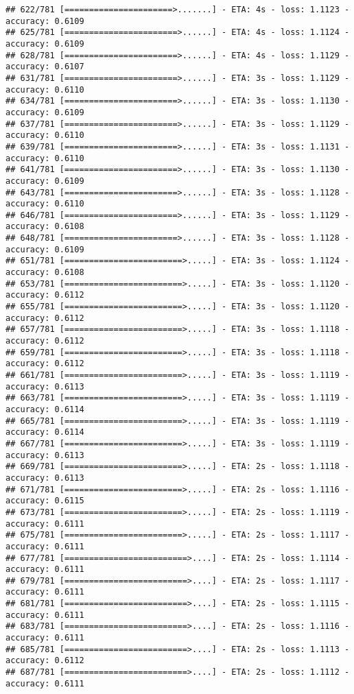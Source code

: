 \documentclass[
]{article}
\begin{document}
\begin{verbatim}
## 622/781 [======================>.......] - ETA: 4s - loss: 1.1123 - accuracy: 0.6109
## 625/781 [=======================>......] - ETA: 4s - loss: 1.1124 - accuracy: 0.6109
## 628/781 [=======================>......] - ETA: 4s - loss: 1.1129 - accuracy: 0.6107
## 631/781 [=======================>......] - ETA: 3s - loss: 1.1129 - accuracy: 0.6110
## 634/781 [=======================>......] - ETA: 3s - loss: 1.1130 - accuracy: 0.6109
## 637/781 [=======================>......] - ETA: 3s - loss: 1.1129 - accuracy: 0.6110
## 639/781 [=======================>......] - ETA: 3s - loss: 1.1131 - accuracy: 0.6110
## 641/781 [=======================>......] - ETA: 3s - loss: 1.1130 - accuracy: 0.6109
## 643/781 [=======================>......] - ETA: 3s - loss: 1.1128 - accuracy: 0.6110
## 646/781 [=======================>......] - ETA: 3s - loss: 1.1129 - accuracy: 0.6108
## 648/781 [=======================>......] - ETA: 3s - loss: 1.1128 - accuracy: 0.6109
## 651/781 [========================>.....] - ETA: 3s - loss: 1.1124 - accuracy: 0.6108
## 653/781 [========================>.....] - ETA: 3s - loss: 1.1120 - accuracy: 0.6112
## 655/781 [========================>.....] - ETA: 3s - loss: 1.1120 - accuracy: 0.6112
## 657/781 [========================>.....] - ETA: 3s - loss: 1.1118 - accuracy: 0.6112
## 659/781 [========================>.....] - ETA: 3s - loss: 1.1118 - accuracy: 0.6112
## 661/781 [========================>.....] - ETA: 3s - loss: 1.1119 - accuracy: 0.6113
## 663/781 [========================>.....] - ETA: 3s - loss: 1.1119 - accuracy: 0.6114
## 665/781 [========================>.....] - ETA: 3s - loss: 1.1119 - accuracy: 0.6114
## 667/781 [========================>.....] - ETA: 3s - loss: 1.1119 - accuracy: 0.6113
## 669/781 [========================>.....] - ETA: 2s - loss: 1.1118 - accuracy: 0.6113
## 671/781 [========================>.....] - ETA: 2s - loss: 1.1116 - accuracy: 0.6115
## 673/781 [========================>.....] - ETA: 2s - loss: 1.1119 - accuracy: 0.6111
## 675/781 [========================>.....] - ETA: 2s - loss: 1.1117 - accuracy: 0.6111
## 677/781 [=========================>....] - ETA: 2s - loss: 1.1114 - accuracy: 0.6111
## 679/781 [=========================>....] - ETA: 2s - loss: 1.1117 - accuracy: 0.6111
## 681/781 [=========================>....] - ETA: 2s - loss: 1.1115 - accuracy: 0.6111
## 683/781 [=========================>....] - ETA: 2s - loss: 1.1116 - accuracy: 0.6111
## 685/781 [=========================>....] - ETA: 2s - loss: 1.1113 - accuracy: 0.6112
## 687/781 [=========================>....] - ETA: 2s - loss: 1.1112 - accuracy: 0.6111

\end{verbatim}
\end{document}
